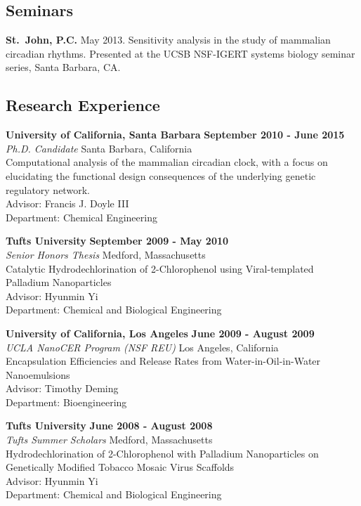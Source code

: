 {\subsection*{Seminars}
{\bfseries St.\ John, P.C.} May 2013. Sensitivity analysis in the study of
mammalian circadian rhythms. Presented at the UCSB NSF-IGERT systems biology
seminar series, Santa Barbara, CA.

\subsection*{Research Experience}

{\bf University of California, Santa Barbara} \hfill {\bf September 2010 - June 2015}\\
{\em Ph.D. Candidate} \hfill Santa Barbara, California\\
Computational analysis of the mammalian circadian clock, with a focus on
elucidating the functional design consequences of the underlying genetic
regulatory network.\\
Advisor: Francis J. Doyle III \\
Department: Chemical Engineering

{\bf Tufts University} \hfill {\bf September 2009 - May 2010}\\
{\em Senior Honors Thesis} \hfill Medford, Massachusetts\\
Catalytic Hydrodechlorination of 2-Chlorophenol using Viral-templated Palladium Nanoparticles\\
Advisor: Hyunmin Yi \\
Department: Chemical and Biological Engineering

{\bf University of California, Los Angeles} \hfill {\bf June 2009 - August 2009}\\
{\em UCLA NanoCER Program (NSF REU)} \hfill Los Angeles, California\\
Encapsulation Efficiencies and Release Rates from Water-in-Oil-in-Water Nanoemulsions\\
Advisor: Timothy Deming\\
Department: Bioengineering

{\bf Tufts University} \hfill {\bf June 2008 - August 2008}\\
{\em Tufts Summer Scholars} \hfill Medford, Massachusetts\\
Hydrodechlorination of 2-Chlorophenol with Palladium Nanoparticles on Genetically Modified Tobacco Mosaic Virus Scaffolds\\
Advisor: Hyunmin Yi\\
Department: Chemical and Biological Engineering

}
